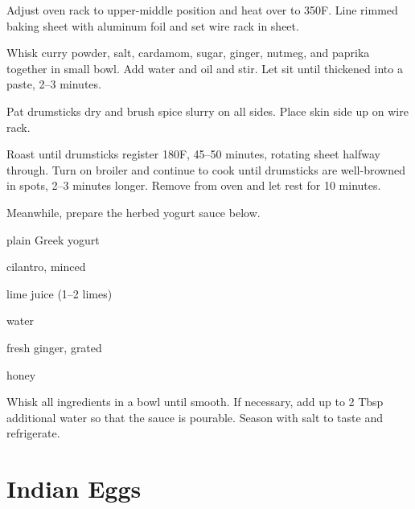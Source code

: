 \documentclass[oneside]{book}  %
\def\thisrecipe{}  %
\newcommand{\recipe}[1]{\section{#1}\def\thisrecipe{: #1}} %
\newcommand{\degF}{\textdegree F\xspace}
\begin{document}
\begin{directions}
  \item Adjust oven rack to upper-middle position and heat over to 350\degF.
    Line rimmed baking sheet with aluminum foil and set wire rack in sheet.

  \item Whisk curry powder, salt, cardamom, sugar, ginger, nutmeg, and paprika
    together in small bowl. Add water and oil and stir. Let sit until thickened
    into a paste, 2--3 minutes.

  \item Pat drumsticks dry and brush spice slurry on all sides. Place skin side
    up on wire rack.

  \item Roast until drumsticks register 180\degF, 45--50 minutes, rotating
    sheet halfway through. Turn on broiler and continue to cook until drumsticks
    are well-browned in spots, 2--3 minutes longer. Remove from oven and let
    rest for 10 minutes.

  \item Meanwhile, prepare the herbed yogurt sauce below.
\end{directions}

\smallskip

\begin{twocols}
  \begin{ingredients}[title=Herbed Yogurt Ingredients]
    \item[1 cup] plain Greek yogurt
    \item[1/2 cup] cilantro, minced
    \item[3 Tbsp] lime juice (1--2 limes)
    \item[2 Tbsp] water
    \item[1/2 tsp] fresh ginger, grated
    \item[1/2 tsp] honey
  \end{ingredients}

  \columnbreak

  \begin{directions1col}
  \item Whisk all ingredients in a bowl until smooth. If necessary, add up to 2
    Tbsp additional water so that the sauce is pourable. Season with salt to
    taste and refrigerate.
  \end{directions1col}
\end{twocols}
\recipe{Indian Eggs} \label{recipe:indian_eggs} %
\end{document}
